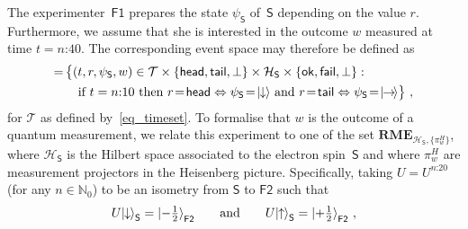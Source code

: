 \documentclass[12pt]{article}
\theoremstyle{plain}
\theoremstyle{definition}
\newcommand*{\cH}{\mathcal{H}}
\newcommand*{\cT}{\mathcal{T}}
\newcommand*{\ket}[1]{{| #1 \rangle}}
\newcommand*{\Friendone}{\mathsf{F1}}
\newcommand*{\Friendtwo}{\mathsf{F2}}
\newcommand*{\Spin}{\mathsf{S}}
\newcommand*{\RME}{\mathbf{RME}}
\newcommand*{\spinup}{\ket{{\hspace{-0.1ex}\uparrow\hspace{-0.1ex}}}}
\newcommand*{\spindown}{\ket{{\hspace{-0.1ex}\downarrow\hspace{-0.1ex}}}}
\newcommand*{\spinright}{\ket{{\hspace{-0.2ex}\rightarrow\hspace{-0.4ex}}}}
\newcommand*{\sminus}{{\textstyle - \frac{1}{2}}}
\newcommand*{\splus}{{\textstyle + \frac{1}{2}}}
\newcommand*{\ok}{\mathsf{ok}}
\newcommand*{\fail}{\mathsf{fail}}
\newcommand*{\head}{\mathsf{head}}
\newcommand*{\tail}{\mathsf{tail}}
\begin{document}
The experimenter~$\Friendone$ prepares the state $\psi_\Spin$ of~$\Spin$ depending on the value $r$. Furthermore, we assume that she is interested in the outcome $w$ measured at time $t = \text{$n$:40}$. The corresponding event space may therefore be defined as
\begin{align}
  [\Friendone] = \,  &  \bigl\{(t, r, \psi_\Spin, w)   \in \cT \times \{\head,\tail,\bot\} \times \cH_{\Spin} \times \{\ok, \fail, \bot\} : \,  \nonumber 
  \\  & \quad  \text{if } t  = \text{$n$:10} \text{ then } r \! = \! \head \Leftrightarrow \psi_{\Spin}\! = \! \spindown \text{ and }  r\! =\! \tail \Leftrightarrow \psi_{\Spin} \! = \! \spinright \label{eq_Fonerpsi}
  \bigr\} \ ,
\end{align}
for $\cT$ as defined by~\eqref{eq_timeset}. 
To formalise that $w$ is the outcome of a quantum measurement, we relate this experiment to one of the set $\RME_{\cH_{\Spin}, \{\pi^H_w\}}$, where $\cH_{\Spin}$ is the Hilbert space associated to the electron spin~$\Spin$ and where $\pi^H_w$ are measurement projectors in the Heisenberg picture. Specifically, taking $U = U^{\text{$n$:20}}$ (for any $n \in \mathbb{N}_0$)  to be an isometry from $\Spin$ to $\Friendtwo$ such that
\begin{align*}
  U \spindown_{\Spin}  =  \ket{\sminus}_{\Friendtwo} \qquad \text{and} \qquad
  U\spinup_{\Spin}  = \ket{\splus}_{\Friendtwo}  \ ,
\end{align*}
\end{document}
